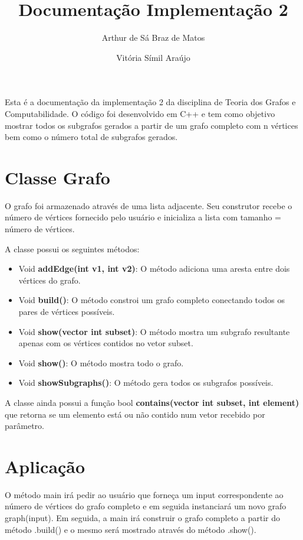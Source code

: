 \documentclass[12pt]{article}
\title{\textbf{Documentação Implementação 2}} %
\author{
  Arthur de Sá Braz de Matos\\
  \and
  Vitória Símil Araújo\\
}
\date{}
\begin{document}
\maketitle

Esta é a documentação da implementação 2 da disciplina de Teoria dos Grafos e Computabilidade. O código foi desenvolvido em C++ e tem como objetivo mostrar todos os subgrafos gerados a partir de um grafo completo com n vértices bem como o número total de subgrafos gerados.

\section{Classe Grafo}
    
    O grafo foi armazenado através de uma lista adjacente. Seu construtor recebe o número de vértices fornecido pelo usuário e inicializa a lista com tamanho = número de vértices.

    A classe possui os seguintes métodos:

    \begin{itemize}
        \item Void \textbf{addEdge(int v1, int v2)}: O método  adiciona uma aresta entre dois vértices do grafo.
        \item Void \textbf{build()}: O método constroi um grafo completo conectando todos os pares de vértices possíveis.
        \item Void \textbf{show(vector int subset)}: O método mostra um subgrafo resultante apenas com os vértices contidos no vetor subset.
        \item Void \textbf{show()}: O método mostra todo o grafo.
        \item Void \textbf{showSubgraphs()}: O método gera todos os subgrafos possíveis.
    \end{itemize}

A classe ainda possui a função bool \textbf{contains(vector int subset, int element)} que retorna se um elemento está ou não contido num vetor recebido por parâmetro.

\section{Aplicação}

    O método main irá pedir ao usuário que forneça um input correspondente ao número de vértices do grafo completo e em seguida instanciará um novo grafo graph(input). Em seguida, a main irá construir o grafo completo a partir do método .build() e o mesmo será mostrado através do método .show().\\
\end{document}
